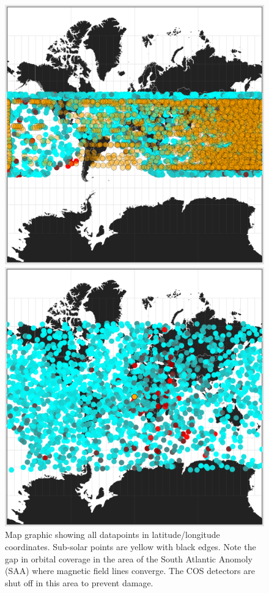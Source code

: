 \documentclass[a4paper,11pt]{article}
\begin{document}
\begin{figure}[!tbp]
  \centering
  \begin{minipage}[b]{0.4\textwidth}
    \includegraphics[width=\textwidth]{raw-lat-long.png}
    \caption{Map graphic showing all datapoints in latitude/longitude coordinates.  Sub-solar points are yellow with 
    black edges.  Note the gap in orbital coverage in the area of the South Atlantic Anomoly (SAA) \cite{norman} where
    magnetic field lines converge.  The COS detectors are shut off in this area to prevent damage. }
  \end{minipage}
  \hfill
  \begin{minipage}[b]{0.4\textwidth}
    \includegraphics[width=\textwidth]{raw-sub-solar.png}

\end{minipage}
\end{figure}
\end{document}
